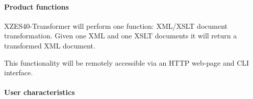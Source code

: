 \paragraph{Product functions}
% 

XZES40-Transformer will perform one function: XML/XSLT document transformation.
Given one XML and one XSLT documents it will return a transformed XML document.

This functionality will be remotely accessible via an HTTP web-page and CLI interface.


\paragraph{User characteristics}

